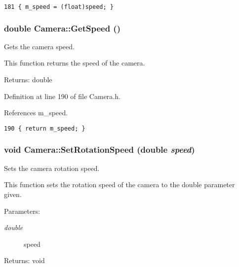 \begin{Code}\begin{verbatim}181 { m_speed = (float)speed; }
\end{verbatim}
\end{Code}


\hypertarget{class_camera_6d305ab5442a489253a321b2a45b11b6}{
\subsubsection[GetSpeed]{\setlength{\rightskip}{0pt plus 5cm}double Camera::GetSpeed ()}}
\label{class_camera_6d305ab5442a489253a321b2a45b11b6}


Gets the camera speed. 

This function returns the speed of the camera.

\begin{Desc}
\item[Returns:]double \end{Desc}


Definition at line 190 of file Camera.h.

References m\_\-speed.

\begin{Code}\begin{verbatim}190 { return m_speed; }
\end{verbatim}
\end{Code}


\hypertarget{class_camera_bce25d2360c703fb5ac6da02d3991bda}{
\subsubsection[SetRotationSpeed]{\setlength{\rightskip}{0pt plus 5cm}void Camera::SetRotationSpeed (double {\em speed})}}
\label{class_camera_bce25d2360c703fb5ac6da02d3991bda}


Sets the camera rotation speed. 

This function sets the rotation speed of the camera to the double parameter given.

\begin{Desc}
\item[Parameters:]
\begin{description}
\item[{\em double}]speed \end{description}
\end{Desc}
\begin{Desc}
\item[Returns:]void \end{Desc}


